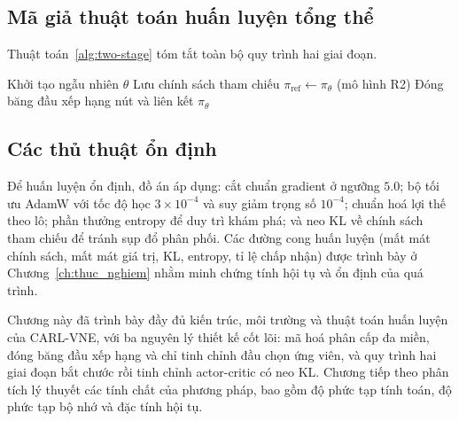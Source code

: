 \documentclass[../DoAn.tex]{subfiles}
\begin{document}
\subsection{Mã giả thuật toán huấn luyện tổng thể}
\label{subsec:train-algo}

Thuật toán~\ref{alg:two-stage} tóm tắt toàn bộ quy trình hai giai đoạn.

\begin{algorithm}[H]
\caption{Huấn luyện hai giai đoạn của CARL-VNE}
\label{alg:two-stage}
\SetAlgoLined
{}
Khởi tạo ngẫu nhiên $\theta$\;
Lưu chính sách tham chiếu $\pi_{\text{ref}} \leftarrow \pi_\theta$ (mô hình R2)\;
Đóng băng đầu xếp hạng nút và liên kết\;
\Return $\pi_\theta$\;
\end{algorithm}

\subsection{Các thủ thuật ổn định}
\label{subsec:train-stable}

Để huấn luyện ổn định, đồ án áp dụng: cắt chuẩn gradient ở ngưỡng $5.0$; bộ tối ưu AdamW với tốc độ học $3\times10^{-4}$ và suy giảm trọng số $10^{-4}$; chuẩn hoá lợi thế theo lô; phần thưởng entropy để duy trì khám phá; và neo KL về chính sách tham chiếu để tránh sụp đổ phân phối. Các đường cong huấn luyện (mất mát chính sách, mất mát giá trị, KL, entropy, tỉ lệ chấp nhận) được trình bày ở Chương~\ref{ch:thuc_nghiem} nhằm minh chứng tính hội tụ và ổn định của quá trình.

Chương này đã trình bày đầy đủ kiến trúc, môi trường và thuật toán huấn luyện của CARL-VNE, với ba nguyên lý thiết kế cốt lõi: mã hoá phân cấp đa miền, đóng băng đầu xếp hạng và chỉ tinh chỉnh đầu chọn ứng viên, và quy trình hai giai đoạn bắt chước rồi tinh chỉnh actor-critic có neo KL. Chương tiếp theo phân tích lý thuyết các tính chất của phương pháp, bao gồm độ phức tạp tính toán, độ phức tạp bộ nhớ và đặc tính hội tụ.
\end{document}
